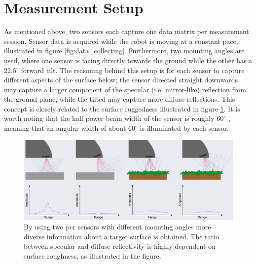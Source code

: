 \section{Measurement Setup}\label{sec:setup}

As mentioned above, two sensors each capture one data matrix per measurement session. Sensor data is acquired while the robot is moving at a constant pace, illustrated in figure \ref{fig:data_collecting}. Furthermore, two mounting angles are used, where one sensor is facing directly towards the ground while the other has a $22.5^\circ$ forward tilt. The reasoning behind this setup is for each sensor to capture different aspects of the surface below; the sensor directed straight downwards may capture a larger component of the specular (i.e. mirror-like) reflection from the ground plane, while the tilted may capture more diffuse reflections. This concept is closely related to the surface ruggedness illustrated in figure \ref{fig:reflections}. It is worth noting that the half power beam width of the sensor is roughly $60^\circ$ \citep{acconeer_datasheet_a111}, meaning that an angular width of about $60^\circ$ is illuminated by each sensor.

\begin{figure}[h]
	\centering
	\includegraphics[scale=0.9]{figs_temp/reflections.jpg}
	\caption{By using two \gls{pcr} sensors with different mounting angles more diverse information about a target surface is obtained. The ratio between specular and diffuse reflectivity is highly dependent on surface roughness, as illustrated in the figure.} 
	\label{fig:reflections}
\end{figure}

